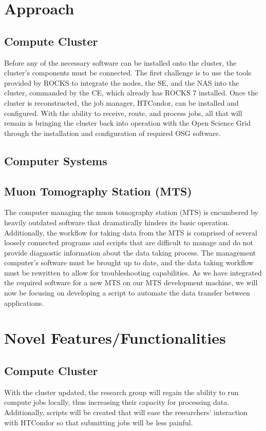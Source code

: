 \documentclass[12pt]{article}
\begin{document}
\section{Approach}
\subsection{Compute Cluster}
Before any of the necessary software can be installed onto the cluster, the
cluster's components must be connected. The first challenge is to use the tools
provided by ROCKS to integrate the nodes, the SE, and the NAS into the cluster,
commanded by the CE, which already has ROCKS 7 installed. Once the cluster is
reconstructed, the job manager, HTCondor, can be installed and configured. With
the ability to receive, route, and process jobs, all that will remain is
bringing the cluster back into operation with the Open Science Grid through the
installation and configuration of required OSG software.
\subsection{Computer Systems}
\subsection{Muon Tomography Station (MTS)}
The computer managing the muon tomography station (MTS) is encumbered by heavily outdated software that dramatically hinders its basic operation. Additionally, the workflow for taking data from the MTS is comprised of several loosely connected programs and scripts that are difficult to manage and do not provide diagnostic information about the data taking process. The management computer’s software must be brought up to date, and the data taking workflow must be rewritten to allow for troubleshooting capabilities. As we have integrated the required software for a new MTS on our MTS development machine, we will now be focusing on developing a script to automate the data transfer between applications.
\section{Novel Features/Functionalities}
\subsection{Compute Cluster}
With the cluster updated, the research group will regain the ability to run
compute jobs locally, thus increasing their capacity for processing
data. Additionally, scripts will be created that will ease the researchers'
interaction with HTCondor so that submitting jobs will be less painful.
\end{document}

